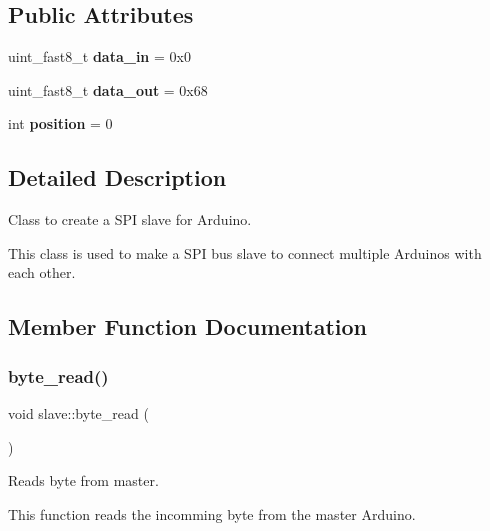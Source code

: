 \subsection*{Public Attributes}
\begin{DoxyCompactItemize}
\item 
\mbox{\label{classslave_af3671b4d8f443e427a0610ad2a2f2977}} 
uint\+\_\+fast8\+\_\+t {\bfseries data\+\_\+in} = 0x0
\item 
\mbox{\label{classslave_a737d2cc1027a4344b862a15bafbf7e81}} 
uint\+\_\+fast8\+\_\+t {\bfseries data\+\_\+out} = 0x68
\item 
\mbox{\label{classslave_a1df63e87edf58a2c29c3c42b1562d1d0}} 
int {\bfseries position} = 0
\end{DoxyCompactItemize}


\subsection{Detailed Description}
Class to create a S\+PI slave for Arduino. 

This class is used to make a S\+PI bus slave to connect multiple Arduino\textquotesingle{}s with each other. 

\subsection{Member Function Documentation}
\mbox{\label{classslave_af42612432810eefab015f40c32958fe9}} 
\subsubsection{\texorpdfstring{byte\+\_\+read()}{byte\_read()}}
{\footnotesize\ttfamily void slave\+::byte\+\_\+read (\begin{DoxyParamCaption}{ }\end{DoxyParamCaption})\hspace{0.3cm}{\ttfamily [inline]}}



Reads byte from master. 

This function reads the incomming byte from the master Arduino. \mbox{\label{classslave_ad7387f369836c10790362781d5ce92da}} 
